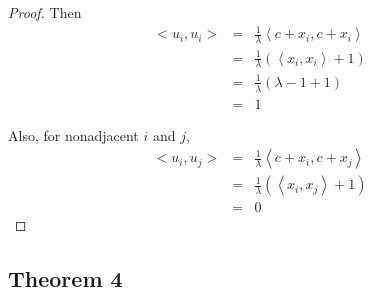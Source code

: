 \documentclass{beamer}
\begin{document}
                  \begin{frame}
                        \begin{proof}
                              Then
                              \begin{eqnarray}
                                    <u_{i},u_{i}> &=& \frac{1}{\lambda} \left<c+x_{i},c+x_{i}\right> \\
                                    &=& \frac{1}{\lambda} (\left<x_{i},x_{i}\right> + 1) \\
                                    &=& \frac{1}{\lambda} (\lambda - 1 + 1) \\
                                    &=& 1
                              \end{eqnarray}

                              Also, for nonadjacent $i$ and $j$,
                              \begin{eqnarray}
                                    <u_{i},u_{j}> &=& \frac{1}{\lambda} \left<c+x_{i},c+x_{j}\right> \\
                                    &=& \frac{1}{\lambda} (\left<x_{i},x_{j}\right>+1) \\
                                    &=& 0
                              \end{eqnarray}
                        \end{proof}
                  \end{frame}

            \subsection{Theorem 4}
\end{document}
